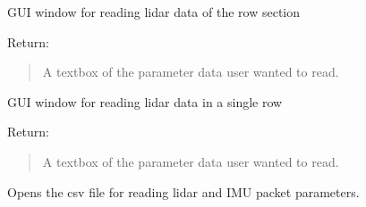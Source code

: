 \documentclass[letterpaper,10pt,english]{sphinxmanual}
\begin{document}

\begin{fulllineitems}
\label{\detokenize{Lidar extraction tool:test_lidar_gui.lidar_row_section}}
GUI window for reading lidar data of the row section

Return:
\begin{quote}

A textbox of the parameter data user wanted to read.
\end{quote}

\end{fulllineitems}


\begin{fulllineitems}
\label{\detokenize{Lidar extraction tool:test_lidar_gui.lidar_single_row}}
GUI window for reading lidar data in a single row

Return:
\begin{quote}

A textbox of the parameter data user wanted to read.
\end{quote}

\end{fulllineitems}


\begin{fulllineitems}
\label{\detokenize{Lidar extraction tool:test_lidar_gui.openfile}}
Opens the csv file for reading lidar and IMU packet parameters.

\end{fulllineitems}

\end{document}
